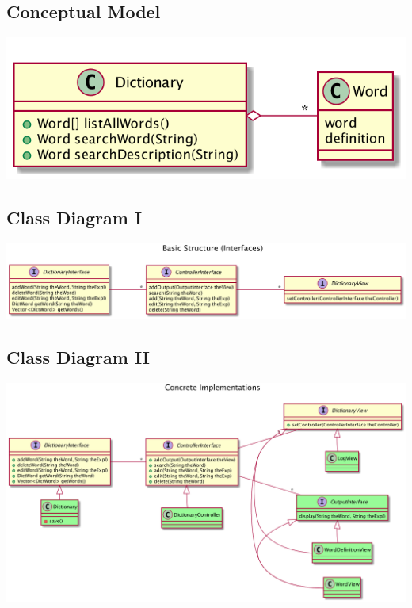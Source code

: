 \documentclass[10pt,t,a4paper]{article}
\begin{document}
\subsection{Conceptual Model}
\label{sec:orgheadline8}
\includegraphics[width=.9\linewidth]{FDictionaryConceptual.png}

\subsection{Class Diagram I}
\label{sec:orgheadline9}
\includegraphics[width=.9\linewidth]{FDictionaryClass1.png}

\subsection{Class Diagram II}
\label{sec:orgheadline10}
\includegraphics[width=.9\linewidth]{FDictionaryClass2.png}
\end{document}
